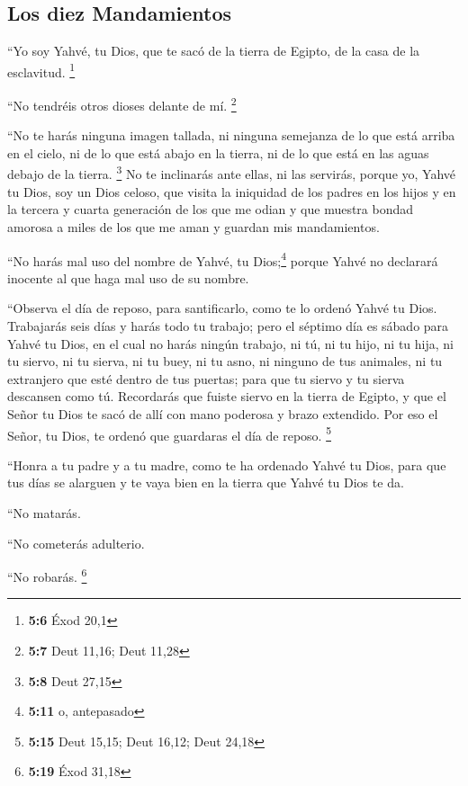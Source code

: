 \hypertarget{los-diez-mandamientos}{%
\subsection{Los diez Mandamientos}\label{los-diez-mandamientos}}

 ``Yo soy Yahvé, tu Dios, que te sacó de la tierra de
Egipto, de la casa de la esclavitud. \footnote{\textbf{5:6} Éxod 20,1}

 ``No tendréis otros dioses delante de mí. \footnote{\textbf{5:7}
  Deut 11,16; Deut 11,28}

 ``No te harás ninguna imagen tallada, ni ninguna
semejanza de lo que está arriba en el cielo, ni de lo que está abajo en
la tierra, ni de lo que está en las aguas debajo de la tierra.
\footnote{\textbf{5:8} Deut 27,15}  No te inclinarás ante
ellas, ni las servirás, porque yo, Yahvé tu Dios, soy un Dios celoso,
que visita la iniquidad de los padres en los hijos y en la tercera y
cuarta generación de los que me odian  y que muestra
bondad amorosa a miles de los que me aman y guardan mis mandamientos.

 ``No harás mal uso del nombre de Yahvé, tu
Dios;\footnote{\textbf{5:11} o, antepasado} porque Yahvé no declarará
inocente al que haga mal uso de su nombre.

 ``Observa el día de reposo, para santificarlo, como te
lo ordenó Yahvé tu Dios.  Trabajarás seis días y harás
todo tu trabajo;  pero el séptimo día es sábado para
Yahvé tu Dios, en el cual no harás ningún trabajo, ni tú, ni tu hijo, ni
tu hija, ni tu siervo, ni tu sierva, ni tu buey, ni tu asno, ni ninguno
de tus animales, ni tu extranjero que esté dentro de tus puertas; para
que tu siervo y tu sierva descansen como tú.  Recordarás
que fuiste siervo en la tierra de Egipto, y que el Señor tu Dios te sacó
de allí con mano poderosa y brazo extendido. Por eso el Señor, tu Dios,
te ordenó que guardaras el día de reposo. \footnote{\textbf{5:15} Deut
  15,15; Deut 16,12; Deut 24,18}

 ``Honra a tu padre y a tu madre, como te ha ordenado
Yahvé tu Dios, para que tus días se alarguen y te vaya bien en la tierra
que Yahvé tu Dios te da.

 ``No matarás.

 ``No cometerás adulterio.

 ``No robarás. \footnote{\textbf{5:19} Éxod 31,18}

